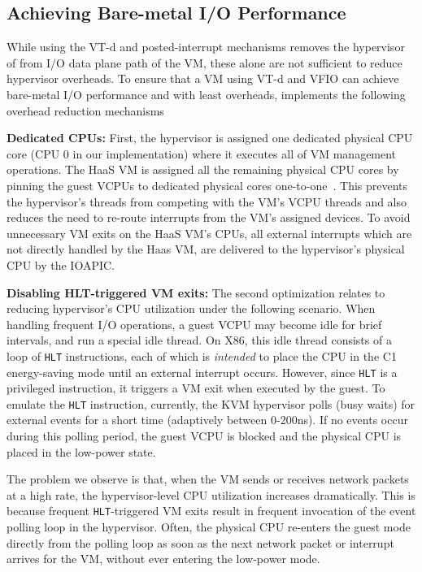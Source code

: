 \subsection{Achieving Bare-metal I/O Performance}
While using the VT-d and posted-interrupt mechanisms removes 
the hypervisor of from I/O data plane path of the VM, these alone are
not sufficient to reduce hypervisor overheads. 
To ensure that a VM using VT-d and VFIO can achieve bare-metal 
I/O performance and with least overheads, \na implements 
the following overhead reduction mechanisms

{\bf Dedicated CPUs:}
First, the hypervisor is assigned one dedicated physical CPU core
(CPU 0 in our implementation)
where it executes all of VM management operations. 
The HaaS VM is assigned all the remaining physical 
CPU cores by pinning the guest VCPUs to 
dedicated physical cores one-to-one~\cite{amit:2015}. 
This prevents the hypervisor's threads 
from competing with the VM's VCPU threads and 
also reduces the need to re-route interrupts
from the VM's assigned devices.
To avoid unnecessary VM exits on the HaaS VM's CPUs,
all external interrupts which are not directly handled
by the Haas VM, are delivered to the hypervisor's physical 
CPU by the IOAPIC.

{\bf Disabling  HLT-triggered VM exits:}
The second optimization relates to reducing hypervisor's CPU utilization
under the following scenario.
When handling frequent I/O operations, 
a guest VCPU  may become idle for brief intervals, and 
run a special idle thread.
On X86, this idle thread consists of a loop of {\tt HLT} instructions, 
each of which is {\em intended} to place the CPU in the C1 energy-saving mode 
until an external interrupt occurs.
However, since {\tt HLT} is a privileged instruction, it triggers a 
VM exit when executed by the guest.
To emulate the {\tt HLT} instruction, currently, the KVM hypervisor
polls (busy waits) for external events for a short time 
(adaptively between 0-200ns). If no events occur during this 
polling period, the guest VCPU is blocked and the physical CPU 
is placed in the low-power state.

The problem we observe is that, when the VM sends or receives network packets
at a high rate, the hypervisor-level CPU utilization increases
dramatically. This is because frequent {\tt HLT}-triggered VM exits
result in frequent invocation of the event polling loop in the hypervisor. 
Often, the physical CPU re-enters the guest mode directly 
from the polling loop as soon as the next network packet 
or interrupt arrives for the VM, without ever entering the low-power mode.

